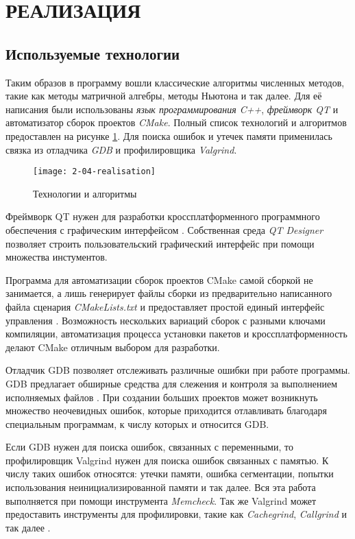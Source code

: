 \section{РЕАЛИЗАЦИЯ}

\subsection{Используемые технологии}

Таким образов в программу вошли классические алгоритмы численных методов, такие как методы матричной алгебры, методы
Ньютона и так далее. Для её написания были использованы \textit{язык программирования C++}, \textit{фреймворк QT}
и автоматизатор сборок проектов \textit{CMake}. Полный список технологий и алгоритмов предоставлен на рисунке \ref{fig:stack}.
Для поиска ошибок и утечек памяти применилась связка из отладчика \textit{GDB} и профилировщика \textit{Valgrind}. 

\begin{figure}
    \texttt{[image: 2-04-realisation]}
    \caption{Технологии и алгоритмы}
    \label{fig:stack}
\end{figure}

Фреймворк QT нужен для разработки кроссплатформенного программного обеспечения с графическим интерфейсом \cite{Wikipedia5}. Собственная
среда \textit{QT Designer} позволяет строить пользовательский графический интерфейс при помощи множества инстументов.

Программа для автоматизации сборок проектов CMake самой сборкой не занимается, а лишь генерирует файлы сборки из предварительно
написанного файла сценария \textit{CMakeLists.txt} и предоставляет простой единый интерфейс управления \cite{Wikipedia4}. Возможность
нескольких вариаций сборок с разными ключами компиляции, автоматизация процесса установки пакетов и кроссплатформенность делают CMake
отличным выбором для разработки.

Отладчик GDB позволяет отслеживать различные ошибки при работе программы. GDB предлагает обширные средства для слежения и
контроля за выполнением исполняемых файлов \cite{Wikipedia2}. При создании больших проектов может возникнуть множество неочевидных
ошибок, которые приходится отлавливать благодаря специальным программам, к числу которых и относится GDB.

Если GDB нужен для поиска ошибок, связанных с переменными, то профилировщик Valgrind нужен для поиска ошибок связанных с памятью.
К числу таких ошибок относятся: утечки памяти, ошибка сегментации, попытки использования неинициализированной памяти и так далее.
Вся эта работа выполняется при помощи инструмента \textit{Memcheck}. Так же Valgrind может предоставить инструменты для профилировки,
такие как \textit{Cachegrind}, \textit{Callgrind} и так далее \cite{Wikipedia3}.

